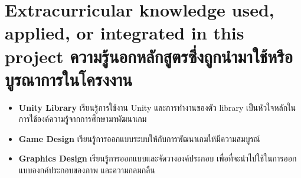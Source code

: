 \section{\ifenglish%
    Extracurricular knowledge used, applied, or integrated in this project
  \else%
    ความรู้นอกหลักสูตรซึ่งถูกนำมาใช้หรือบูรณาการในโครงงาน
  \fi
 }

\begin{itemize}
  \item \textbf{Unity Library} เรียนรู้การใช้งาน Unity และการทำงานของตัว library เป็นหัวใจหลักในการใช้องค์ความรู้จากการศึกษามาพัฒนาเกม
  \item \textbf{Game Design} เรียนรู้การออกแบบระบบให้กับการพัฒนาเกมให้มีความสมบูรณ์
  \item \textbf{Graphics Design} เรียนรู้การออกแบบและจัดวางองค์ประกอบ เพื่อที่จะนำไปใช้ในการออกแบบองกค์ประกอบของภาพ และความกลมกลืน
\end{itemize}
